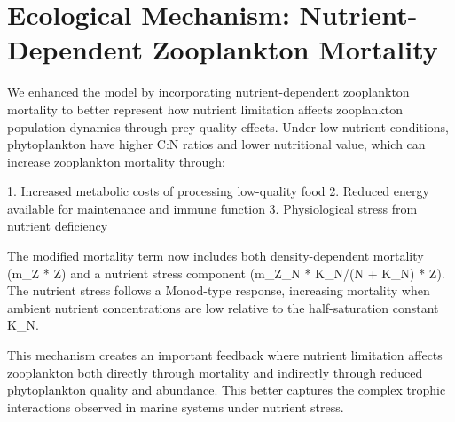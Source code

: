 \section{Ecological Mechanism: Nutrient-Dependent Zooplankton Mortality}

We enhanced the model by incorporating nutrient-dependent zooplankton mortality to better represent how nutrient limitation affects zooplankton population dynamics through prey quality effects. Under low nutrient conditions, phytoplankton have higher C:N ratios and lower nutritional value, which can increase zooplankton mortality through:

1. Increased metabolic costs of processing low-quality food
2. Reduced energy available for maintenance and immune function
3. Physiological stress from nutrient deficiency

The modified mortality term now includes both density-dependent mortality (m_Z * Z) and a nutrient stress component (m_Z_N * K_N/(N + K_N) * Z). The nutrient stress follows a Monod-type response, increasing mortality when ambient nutrient concentrations are low relative to the half-saturation constant K_N.

This mechanism creates an important feedback where nutrient limitation affects zooplankton both directly through mortality and indirectly through reduced phytoplankton quality and abundance. This better captures the complex trophic interactions observed in marine systems under nutrient stress.
